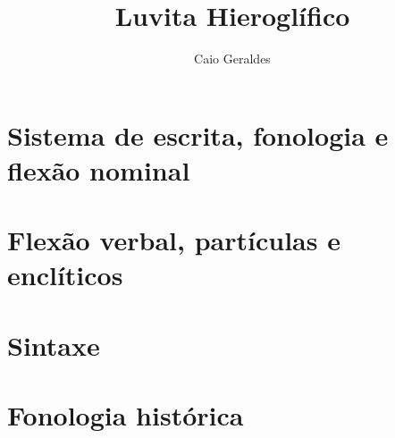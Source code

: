 \documentclass[apostila]{luvita}
\title{Luvita Hieroglífico}
\author{Caio Geraldes}
\begin{document}
\frontmatter

\thecoverpage%
\cleardoublepage%
\thetitlepage%


\cleardoublepage%


\cleardoublepage%
\tableofcontents*

\cleardoublepage%
\listoffigures*

\mainmatter%




\chapter{Sistema de escrita, fonologia e flexão nominal}


\chapter{Flexão verbal, partículas e enclíticos}


\chapter{Sintaxe}


\chapter{Fonologia histórica}





\backmatter%






%
%



\printbibliography%

\cleardoublepage%

\colofao{}
\end{document}

